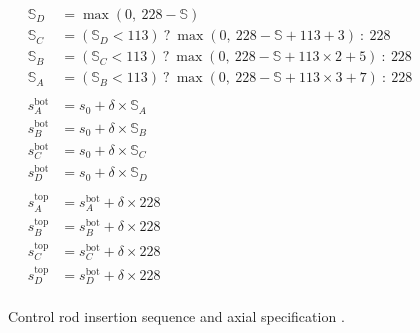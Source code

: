 \begin{figure}
{\begin{minipage}{6.5in}
      \begin{align*}
        \mathbb{S}_D &=  \max(0,~228-\mathbb{S}) \\
        \mathbb{S}_C &=  (\mathbb{S}_D<113) ~?~ \max(0,~228-\mathbb{S}+113  +3) ~:~ 228 \\
        \mathbb{S}_B &=  (\mathbb{S}_C<113) ~?~ \max(0,~228-\mathbb{S}+113\times 2+5) ~:~ 228 \\
        \mathbb{S}_A &=  (\mathbb{S}_B<113) ~?~ \max(0,~228-\mathbb{S}+113\times 3+7) ~:~ 228 \\
\\
        s_A^{\mathrm{bot}} &=  s_0 + \delta \times \mathbb{S}_A \\
        s_B^{\mathrm{bot}} &=  s_0 + \delta \times \mathbb{S}_B \\
        s_C^{\mathrm{bot}} &=  s_0 + \delta \times \mathbb{S}_C \\
        s_D^{\mathrm{bot}} &=  s_0 + \delta \times \mathbb{S}_D \\
\\
        s_A^{\mathrm{top}} &=  s_A^{\mathrm{bot}} + \delta \times 228 \\
        s_B^{\mathrm{top}} &=  s_B^{\mathrm{bot}} + \delta \times 228 \\
        s_C^{\mathrm{top}} &=  s_C^{\mathrm{bot}} + \delta \times 228 \\
        s_D^{\mathrm{top}} &=  s_D^{\mathrm{bot}} + \delta \times 228 \\
      \end{align*}
      
    \end{minipage}
  }
  
  \caption[Control rod insertion sequence and axial specification]{ Control rod insertion sequence and axial specification \cite{smith_comm}. \label{fig_cr_algorithm}}

\end{figure}
